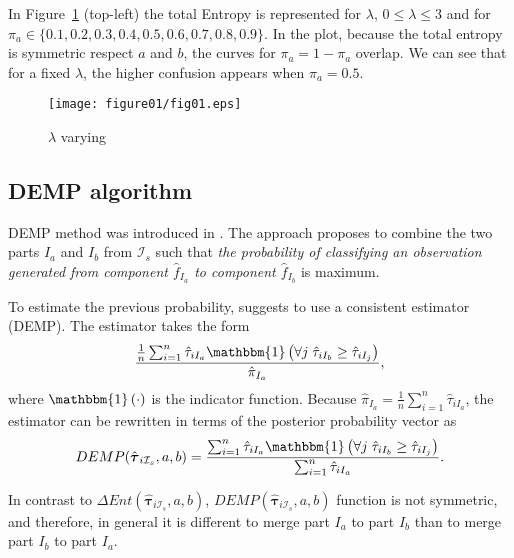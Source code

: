 \documentclass[10pt, a4paper]{article}
\newcommand{\m}[1]{\boldsymbol{#1}}
\begin{document}
In Figure~\ref{fig:mu_varying} (top-left) the total Entropy is represented for $\lambda$, $0 \leq \lambda \leq 3$ and for $\pi_a \in \{ 0.1, 0.2, 0.3, 0.4, 0.5, 0.6, 0.7, 0.8, 0.9\}$. In the plot, because the total entropy is symmetric respect $a$ and $b$, the curves for $\pi_a = 1-\pi_a$ overlap. We can see that for a fixed $\lambda$, the higher confusion appears when $\pi_a = 0.5$.

\begin{figure}[!t]
\centering
\texttt{[image: figure01/fig01.eps]}
\caption{$\lambda$ varying}
\label{fig:mu_varying}
\end{figure}



\subsection*{DEMP algorithm}

DEMP method was introduced in \cite{hennig2010methods}. The approach proposes to combine the two parts $I_a$ and $I_b$ from $ \mathcal{I}_s$ such that \emph{the probability of classifying an observation generated from component $\hat{f}_{I_a}$ to component $\hat{f}_{I_b}$} is maximum.

To estimate the previous probability,  \cite{hennig2010methods} suggests to use a consistent estimator (DEMP). The estimator takes the form
\[
\frac{ \frac{1}{n} \sum_{i=1}^n {\hat{\tau}_{iI_a} \mathbbm{1}\left( \forall j\; \hat{\tau}_{i I_{b}} \geq \hat{\tau}_{iI_j} \right)}}{ \hat{\pi}_{I_a}},
\]
where $\mathbbm{1}\left( \cdot \right)$ is the indicator function. Because $ \hat{\pi}_{I_a} = \frac{1}{n} \sum_{i=1}^n \hat{\tau}_{iI_a}$, the estimator can be rewritten in terms of the posterior probability vector as
\begin{equation}\label{demp_criteria}
DEMP(\hat{\m \tau}_{i \mathcal{I}_s}, a, b) =\frac{ \sum_{i=1}^n {\hat{\tau}_{iI_a} \mathbbm{1}\left( \forall j\; \hat{\tau}_{i I_{b}} \geq \hat{\tau}_{iI_j} \right)}}{\sum_{i=1}^n \hat{\tau}_{iI_a} }.
\end{equation}

In contrast to $\Delta Ent(\hat{\m \tau}_{i \mathcal{I}_s}, a, b)$, $DEMP(\hat{\m \tau}_{i \mathcal{I}_s}, a, b)$ function is not symmetric, and therefore, in general it is different to merge part $I_a$ to part $I_b$ than to merge part $I_b$ to part $I_a$. 
\end{document}
